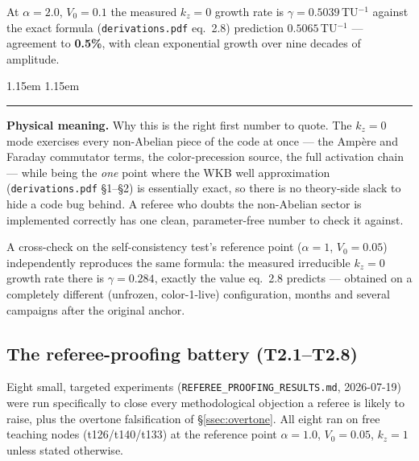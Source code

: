 \documentclass[11pt,a4paper]{article}
\numberwithin{equation}{section}
\theoremstyle{remark}
\newenvironment{physmeaning}%
{\par\medskip\noindent
 \begin{list}{}{\leftmargin 1.15em \rightmargin 1.15em \listparindent 0pt
 \itemindent 0pt \parsep 2pt \topsep 2pt}\item\relax
 \small\textcolor{meancol}{\rule[-0.6ex]{2.6pt}{2.4ex}}\hspace{0.55em}%
 \textcolor{meancol}{\textbf{Physical meaning.}}\hspace{0.5em}\ignorespaces}%
{\end{list}\medskip}
\newcommand{\Vo}{V_0}
\newcommand{\kz}{k_z}
\begin{document}
At $\alpha=2.0$, $\Vo=0.1$ the measured $\kz=0$ growth rate is
$\gamma=0.5039\,$TU$^{-1}$ against the exact formula
(\texttt{derivations.pdf} eq.~2.8) prediction $0.5065\,$TU$^{-1}$ ---
agreement to \textbf{0.5\%}, with clean exponential growth over nine
decades of amplitude.

\begin{physmeaning}
Why this is the right first number to quote. The $\kz=0$ mode exercises
every non-Abelian piece of the code at once — the Amp\`ere and Faraday
commutator terms, the color-precession source, the full activation chain
— while being the \emph{one} point where the WKB well approximation
(\texttt{derivations.pdf} \S1--\S2) is essentially exact, so there is no
theory-side slack to hide a code bug behind. A referee who doubts the
non-Abelian sector is implemented correctly has one clean, parameter-free
number to check it against.
\end{physmeaning}

A cross-check on the self-consistency test's reference point ($\alpha=1$,
$\Vo=0.05$) independently reproduces the same formula: the measured
irreducible $\kz=0$ growth rate there is $\gamma=0.284$, exactly the value
eq.~2.8 predicts — obtained on a completely different (unfrozen,
color-1-live) configuration, months and several campaigns after the
original anchor.

\subsection{The referee-proofing battery (T2.1--T2.8)}
\label{ssec:t2battery}

Eight small, targeted experiments (\texttt{REFEREE\_PROOFING\_RESULTS.md},
2026-07-19) were run specifically to close every methodological objection
a referee is likely to raise, plus the overtone falsification of
\S\ref{ssec:overtone}. All eight ran on free teaching nodes
(t126/t140/t133) at the reference point $\alpha=1.0$, $\Vo=0.05$,
$\kz=1$ unless stated otherwise.
\end{document}
